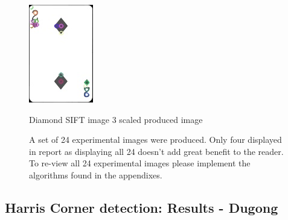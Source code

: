 \documentclass[conference]{IEEEtran}
\begin{document}
\begin{figure}[!htb]
\begin{minipage}[b]{0.2\textwidth}
    \includegraphics[width=\textwidth]{../programme/results/Task_1/scaled_experiements/SIFT/diamond/image_3.jpg}
    \caption{Diamond SIFT image 3 scaled produced image}
    \label{Diamond SIFT image 3 scaled produced image}
  \end{minipage}
  {\caption*{A set of 24 experimental images were produced. Only four displayed in report as displaying all 24 doesn't add great benefit to the reader. To re-view all 24 experimental images please implement the algorithms found in the appendixes.}}
\end{figure}

\subsection{Harris Corner detection: Results - Dugong}
\end{document}
